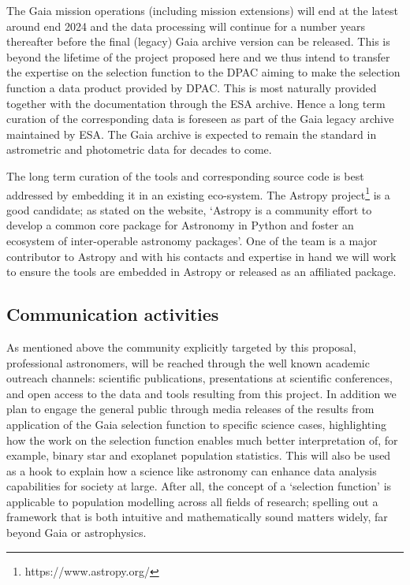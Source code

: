 The Gaia mission operations (including mission extensions) will end at the latest around end 2024 and the data processing will continue for a number years thereafter before the final (legacy) Gaia archive version can be released. This is beyond the lifetime of the project proposed here and we thus intend to transfer the expertise on the selection function to the DPAC aiming to make the selection function a data product provided by DPAC. This is most naturally provided together with the documentation through the ESA archive. Hence a long term curation of the corresponding data is foreseen as part of the Gaia legacy archive maintained by ESA. The Gaia archive is expected to remain the standard in astrometric and photometric data for decades to come. 

The long term curation of the {\acro} tools and corresponding source code is best addressed by embedding it in an existing eco-system. The Astropy project\footnote{https://www.astropy.org/} is a good candidate; as stated on the website, `Astropy is a community effort to develop a common core package for Astronomy in Python and foster an ecosystem of inter-operable astronomy packages'. One of the {\acro} team is a major contributor to Astropy and with his contacts and expertise in hand we will work to ensure the {\acro} tools are embedded in Astropy or released as an affiliated package.

\subsection{Communication activities}
\label{sec:communication-activities}

As mentioned above the community explicitly targeted by this proposal, professional astronomers, will be reached through the well known academic outreach channels: scientific publications, presentations at scientific conferences, and open access to the data and tools resulting from this project. In addition we plan to engage the general public through media releases of the results from application of the Gaia selection function to specific science cases, highlighting how the work on the selection function enables much better interpretation of, for example, binary star and exoplanet population statistics. This will also be used as a hook to explain how a science like astronomy can enhance data analysis capabilities for society at large. After all, the concept of a `selection function' is applicable to population modelling across all fields of research; spelling out a framework that is both intuitive and mathematically sound matters widely, far beyond Gaia or astrophysics.
